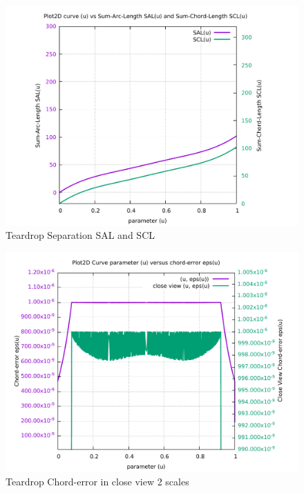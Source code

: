 \begin{figure}
	\caption     {Teardrop Separation SAL and SCL}
	\label{08-img-Teardrop-Separation-SAL-and-SCL.pdf}
	\includegraphics[width=1.00\textwidth]{Chap4/appendix/app-Teardrop/plots/08-img-Teardrop-Separation-SAL-and-SCL.pdf}
\end{figure}

\clearpage
\pagebreak

\begin{figure}
	\caption     {Teardrop Chord-error in close view 2 scales}
	\label{09-img-Teardrop-Chord-error-in-close-view-2-scales.pdf}
	\includegraphics[width=1.00\textwidth]{Chap4/appendix/app-Teardrop/plots/09-img-Teardrop-Chord-error-in-close-view-2-scales.pdf}
\end{figure}

